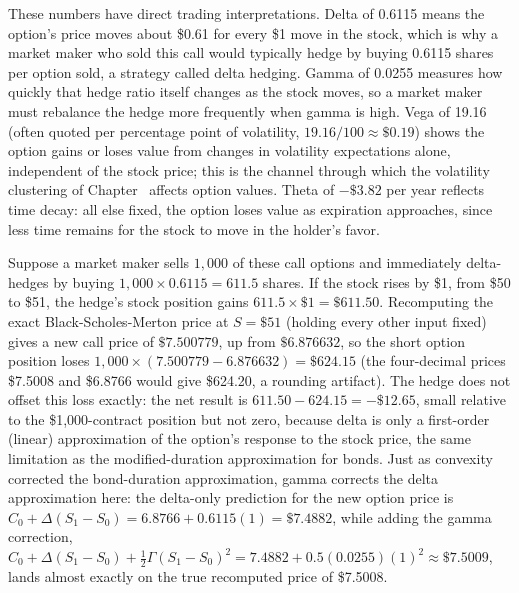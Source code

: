 \documentclass[../ai_in_finance]{subfiles}
\begin{document}
These numbers have direct trading interpretations. Delta of 0.6115 means the option's price moves about \$0.61 for every \$1 move in the stock, which is why a market maker who sold this call would typically hedge by buying 0.6115 shares per option sold, a strategy called delta hedging. Gamma of 0.0255 measures how quickly that hedge ratio itself changes as the stock moves, so a market maker must rebalance the hedge more frequently when gamma is high. Vega of 19.16 (often quoted per percentage point of volatility, $19.16/100 \approx \$0.19$) shows the option gains or loses value from changes in volatility expectations alone, independent of the stock price; this is the channel through which the volatility clustering of Chapter~ affects option values. Theta of $-\$3.82$ per year reflects time decay: all else fixed, the option loses value as expiration approaches, since less time remains for the stock to move in the holder's favor.


Suppose a market maker sells $1{,}000$ of these call options and immediately delta-hedges by buying $1{,}000 \times 0.6115 = 611.5$ shares. If the stock rises by \$1, from \$50 to \$51, the hedge's stock position gains $611.5 \times \$1 = \$611.50$. Recomputing the exact Black-Scholes-Merton price at $S=\$51$ (holding every other input fixed) gives a new call price of $\$7.500779$, up from $\$6.876632$, so the short option position loses $1{,}000 \times (7.500779 - 6.876632) = \$624.15$ (the four-decimal prices \$7.5008 and \$6.8766 would give \$624.20, a rounding artifact). The hedge does not offset this loss exactly: the net result is $611.50 - 624.15 = -\$12.65$, small relative to the \$1,000-contract position but not zero, because delta is only a first-order (linear) approximation of the option's response to the stock price, the same limitation as the modified-duration approximation for bonds.
Just as convexity corrected the bond-duration approximation, gamma corrects the delta approximation here: the delta-only prediction for the new option price is $C_0 + \Delta(S_1-S_0) = 6.8766 + 0.6115(1) = \$7.4882$, while adding the gamma correction, $C_0 + \Delta(S_1-S_0) + \tfrac{1}{2}\Gamma(S_1-S_0)^2 = 7.4882 + 0.5(0.0255)(1)^2 \approx \$7.5009$, lands almost exactly on the true recomputed price of \$7.5008.
\end{document}
